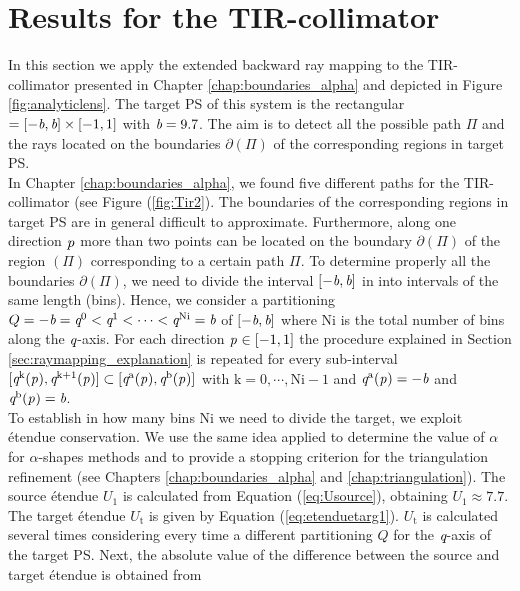 \section{Results for the TIR-collimator}\label{sec:TIR}
In this section we apply the extended backward ray mapping to the TIR-collimator presented in Chapter \ref{chap:boundaries_alpha} and depicted in Figure \ref{fig:analyticlens}. The target PS of this system is the rectangular $= [-\textit{b}, \textit{b}]\times[-1,1]$ with $\textit{b}=9.7$. The aim is to detect all the possible path $\Pi$ and the rays located on the boundaries $\partial$$(\Pi)$ of the corresponding regions in target PS. 
\\ \indent In Chapter \ref{chap:boundaries_alpha}, we found five different paths for the TIR-collimator (see Figure (\ref{fig:Tir2}). The boundaries of the corresponding regions in target PS  are in general difficult to approximate. Furthermore, along one direction $\textit{p}_{\textrm{} \textit{}}$ more than two points can be located on the boundary $\partial$$(\Pi)$ of the region $(\Pi)$ corresponding to a certain path $\Pi$. To determine properly all the boundaries 
$\partial$$(\Pi)$, we need to divide the interval $[-\textit{b}, \textit{b}]$ in 
 into intervals of the same length (bins). Hence, we consider a partitioning 
$Q = -\textit{b}=\textit{q}^{0}<\textit{q}^{1}<\cdots<\textit{q}^{\textrm{Ni}}=\textit{b}$ of $[-\textit{b}, \textit{b}]$ where $\textrm{Ni}$ is the total number of bins along the $\textit{q}$-axis.
For each direction $\textit{p}_{\textrm{} \textit{}}\in [-1,1]$ the procedure explained in Section \ref{sec:raymapping_explanation} is repeated for every sub-interval $[\textit{q}^{\textrm{k}}(\textit{p}_{\textrm{} \textit{}}), \textit{q}^{\textrm{k}+1}(\textit{p}_{\textrm{} \textit{}})]\subset [\textit{q}^{\textrm{a}}(\textit{p}_{\textrm{} \textit{}}), \textit{q}^{\textrm{b}}(\textit{p}_{\textrm{} \textit{}})]$ with $\textrm{k}=0, \cdots, \textrm{Ni}-1$ and $\textit{q}^{\textrm{a}}(\textit{p}_{\textrm{} \textit{}}) = -\textit{b}$ and $\textit{q}^{\textrm{b}}(\textit{p}_{\textrm{} \textit{}}) = \textit{b}$.\\ \indent
To establish in how many bins \textrm{Ni} we need to divide the target, we exploit \'{e}tendue conservation. We use the same idea applied to determine the value of $\alpha$ for $\alpha$-shapes methods and to provide a stopping criterion for the triangulation refinement (see Chapters \ref{chap:boundaries_alpha} and \ref{chap:triangulation}). 
The source \'{e}tendue $U_1$ is calculated from Equation (\ref{eq:Usource}), obtaining $U_1 \approx 7.7$. The target \'{e}tendue $U_\textrm{t}$ is given by Equation (\ref{eq:etenduetarg1}). $U_\textrm{t}$ is calculated several times considering every time a different partitioning $Q$ for the $\textit{q}$-axis of the target PS. Next, the absolute value of the difference between the source and target \'{e}tendue is obtained from
